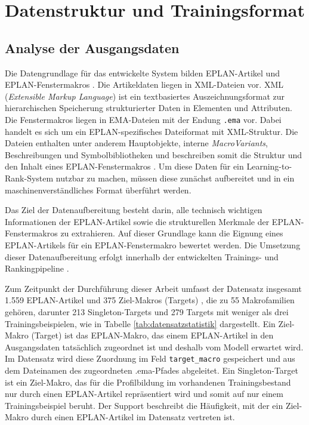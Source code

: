 ﻿\chapter{Datenstruktur und Trainingsformat}
\label{chap:analyse_der_datenstrukturen}

\section{Analyse der Ausgangsdaten}

Die Datengrundlage für das entwickelte System bilden EPLAN-Artikel \parencite{EPLANArtikelverwaltung} und EPLAN-Fenstermakros \parencite{EPLAN-Makros}. Die Artikeldaten liegen in XML-Dateien vor. XML (\textit{Extensible Markup Language}) ist ein textbasiertes Auszeichnungsformat zur hierarchischen Speicherung strukturierter Daten in Elementen und Attributen. Die Fenstermakros liegen in EMA-Dateien mit der Endung \texttt{.ema} vor. Dabei handelt es sich um ein EPLAN-spezifisches Dateiformat mit XML-Struktur. Die Dateien enthalten unter anderem Hauptobjekte, interne \textit{MacroVariants}, Beschreibungen und Symbolbibliotheken \parencite{srcStep911} und beschreiben somit die Struktur und den Inhalt eines EPLAN-Fenstermakros \parencite{EPLAN-Makros}.
Um diese Daten für ein Learning-to-Rank-System nutzbar zu machen, müssen diese zunächst aufbereitet und in ein maschinenverständliches Format überführt werden.

Das Ziel der Datenaufbereitung besteht darin, alle technisch wichtigen Informationen der EPLAN-Artikel \parencite{EPLANArtikelverwaltung} sowie die strukturellen Merkmale der EPLAN-Fenstermakros \parencite{EPLAN-Makros} zu extrahieren. Auf dieser Grundlage kann die Eignung eines EPLAN-Artikels \parencite{EPLANArtikelverwaltung} für ein EPLAN-Fenstermakro \parencite{EPLAN-Makros} bewertet werden. 
Die Umsetzung dieser Datenaufbereitung erfolgt innerhalb der entwickelten Trainings- und Rankingpipeline \parencite{srcStep911,srcPipeline}.

Zum Zeitpunkt der Durchführung dieser Arbeit umfasst der Datensatz insgesamt 1.559 EPLAN-Artikel \parencite{EPLANArtikelverwaltung} und 375 Ziel-Makros (Targets) \parencite{EPLAN-Makros}, die zu 55 Makrofamilien gehören, darunter 213 Singleton-Targets und 279 Targets mit weniger als drei Trainingsbeispielen, wie in Tabelle \ref{tab:datensatzstatistik} dargestellt. Ein Ziel-Makro (Target) ist das EPLAN-Makro, das einem EPLAN-Artikel in den Ausgangsdaten tatsächlich zugeordnet ist und deshalb vom Modell erwartet wird. Im Datensatz wird diese Zuordnung im Feld \texttt{target\_macro} gespeichert und aus dem Dateinamen des zugeordneten .ema-Pfades abgeleitet.
Ein Singleton-Target ist ein Ziel-Makro, das für die Profilbildung im vorhandenen Trainingsbestand nur durch einen EPLAN-Artikel repräsentiert wird und somit auf nur einem Trainingsbeispiel beruht. Der Support beschreibt die Häufigkeit, mit der ein Ziel-Makro durch einen EPLAN-Artikel \parencite{EPLANArtikelverwaltung} im Datensatz vertreten ist. 

